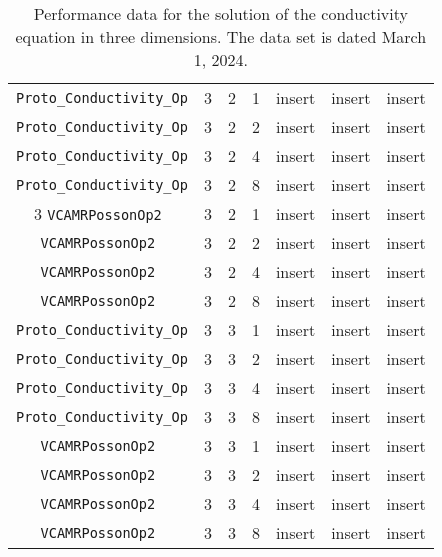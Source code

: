 \documentclass{article}
\begin{document}
\begin{small}
\begin{table}
\begin{center}
\begin{tabular}{|c|c|c|c|c|c||c|}
\hline                                                                               
 {\tt Proto\_Conductivity\_Op} & 3 & 2   & 1    &  insert  &  insert    & insert    \\
 {\tt Proto\_Conductivity\_Op} & 3 & 2   & 2    &  insert  &  insert    & insert    \\
 {\tt Proto\_Conductivity\_Op} & 3 & 2   & 4    &  insert  &  insert    & insert    \\
 {\tt Proto\_Conductivity\_Op} & 3 & 2   & 8    &  insert  &  insert    & insert    \\
\hline                           3                                                    
 {\tt VCAMRPossonOp2         } & 3 & 2   & 1    &  insert  &  insert    & insert   \\
 {\tt VCAMRPossonOp2         } & 3 & 2   & 2    &  insert  &  insert    & insert   \\
 {\tt VCAMRPossonOp2         } & 3 & 2   & 4    &  insert  &  insert    & insert   \\
 {\tt VCAMRPossonOp2         } & 3 & 2   & 8    &  insert  &  insert    & insert   \\
 \hline                                                                              
 {\tt Proto\_Conductivity\_Op} & 3 & 3   & 1    &  insert  &  insert    & insert    \\
 {\tt Proto\_Conductivity\_Op} & 3 & 3   & 2    &  insert  &  insert    & insert    \\
 {\tt Proto\_Conductivity\_Op} & 3 & 3   & 4    &  insert  &  insert    & insert    \\
 {\tt Proto\_Conductivity\_Op} & 3 & 3   & 8    &  insert  &  insert    & insert    \\
\hline                                                                               
 {\tt VCAMRPossonOp2         } & 3 & 3   & 1    &  insert  &  insert    & insert   \\
 {\tt VCAMRPossonOp2         } & 3 & 3   & 2    &  insert  &  insert    & insert   \\
 {\tt VCAMRPossonOp2         } & 3 & 3   & 4    &  insert  &  insert    & insert   \\
 {\tt VCAMRPossonOp2         } & 3 & 3   & 8    &  insert  &  insert    & insert   \\
 \hline
\end{tabular}
\end{center}
\label{tab::conductivity_2d}
\caption
    {
      Performance data for the solution of the conductivity
      equation in three dimensions.
      The data set is dated March 1, 2024.
    }
\end{table}
\end{small}
\end{document}

